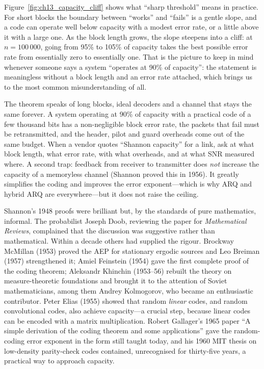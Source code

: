 Figure~\ref{fig:ch13_capacity_cliff} shows what ``sharp threshold'' means in practice. For short
blocks the boundary between ``works'' and ``fails'' is a gentle slope, and a code can operate well
below capacity with a modest error rate, or a little above it with a large one. As the block
length grows, the slope steepens into a cliff: at $n=100\,000$, going from 95\% to 105\% of
capacity takes the best possible error rate from essentially zero to essentially one. That is the
picture to keep in mind whenever someone says a system ``operates at 90\% of capacity'': the
statement is meaningless without a block length and an error rate attached, which brings us to the
most common misunderstanding of all.

\begin{pitfall}
The theorem speaks of long blocks, ideal decoders and a channel that stays the same forever. A
system operating at 90\% of capacity with a practical code of a few thousand bits has a
non-negligible block error rate, the packets that fail must be retransmitted, and the header,
pilot and guard overheads come out of the same budget. When a vendor quotes ``Shannon capacity''
for a link, ask at what block length, what error rate, with what overheads, and at what SNR
measured where. A second trap: feedback from receiver to transmitter does \emph{not} increase the
capacity of a memoryless channel (Shannon proved this in 1956). It greatly simplifies the coding
and improves the error exponent---which is why ARQ and hybrid ARQ are everywhere---but it does not
raise the ceiling.
\end{pitfall}

\begin{history}
Shannon's 1948 proofs were brilliant but, by the standards of pure mathematics, informal. The
probabilist Joseph Doob, reviewing the paper for \emph{Mathematical Reviews}, complained that the
discussion was suggestive rather than mathematical. Within a decade others had supplied the rigour.
Brockway McMillan (1953) proved the AEP for stationary ergodic sources and Leo Breiman (1957)
strengthened it; Amiel Feinstein (1954) gave the first complete proof of the coding theorem;
Aleksandr Khinchin (1953--56) rebuilt the theory on measure-theoretic foundations and brought
it to the attention of Soviet mathematicians, among them Andrey Kolmogorov, who became an
enthusiastic contributor. Peter Elias (1955) showed that random \emph{linear} codes, and random
convolutional codes, also achieve capacity---a crucial step, because linear codes can be encoded
with a matrix multiplication. Robert Gallager's 1965 paper ``A simple derivation of the coding
theorem and some applications'' gave the random-coding error exponent in the form still taught
today, and his 1960 MIT thesis on low-density parity-check codes contained, unrecognised for
thirty-five years, a practical way to approach capacity.
\end{history}

